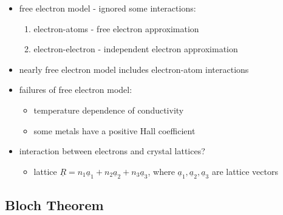 \documentclass[a4paper,11pt,normalem]{article}
\begin{document}
\begin{itemize}
    \item free electron model - ignored some interactions:
        \begin{enumerate}
            \item electron-atoms - free electron approximation
            \item electron-electron - independent electron approximation
        \end{enumerate}
    \item nearly free electron model includes electron-atom interactions
    \item failures of free electron model:
        \begin{itemize}
            \item temperature dependence of conductivity
            \item some metals have a positive Hall coefficient
        \end{itemize}
    \item interaction between electrons and crystal lattices?
        \begin{itemize}
            \item lattice \(\underline{R} = n_1\underline{a}_1 + n_2\underline{a}_2 + n_3\underline{a}_3\), where \(\underline{a}_1,\underline{a}_2,\underline{a}_3\) are lattice vectors
        \end{itemize}
\end{itemize}

\subsection{Bloch Theorem}
\end{document}
